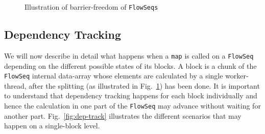 \documentclass[runningheads,a4paper,fleqn]{llncs}
\begin{document}
\begin{figure}
  \caption{Illustration of barrier-freedom of \texttt{FlowSeqs}}
  \label{fig:barrier-free}
\end{figure}

\subsection{Dependency Tracking}
We will now describe in detail what happens when a \texttt{map} is
called on a \texttt{FlowSeq} depending on the different possible states of
its blocks. A block is a chunk of the \texttt{FlowSeq} internal
data-array whose elements are calculated by a single worker-thread, after
the splitting (as illustrated 
in Fig.~\ref{fig:barrier-free}) has been done. It is important to
understand that dependency tracking 
happens for each block individually and hence the calculation in one
part of the \texttt{FlowSeq} may advance without waiting for another
part. Fig.~\ref{fig:dep-track} illustrates the different scenarios that
may happen on a single-block level.
\end{document}
